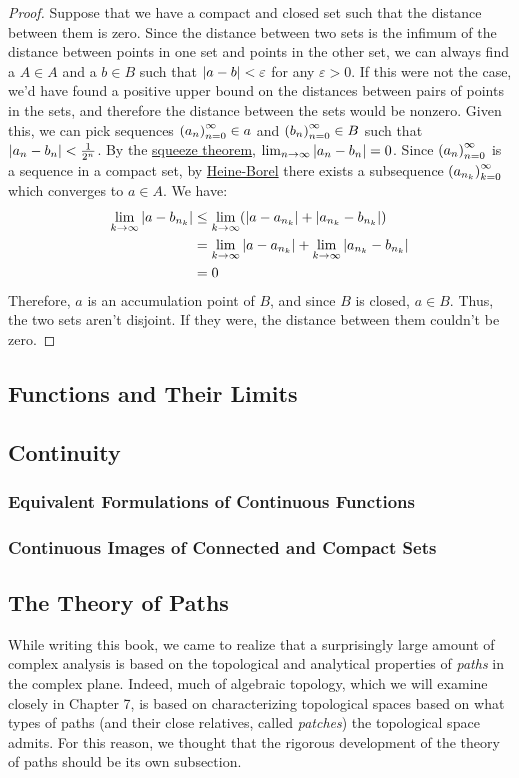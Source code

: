 \begin{proof}
Suppose that we have a compact and closed set such that the distance between them is zero. Since the distance between two sets is the infimum of the distance between points in one set and points in the other set, we can always find a $A \in A$ and a $b \in B$ such that $\left\lvert a-b \right\rvert < \varepsilon$ for any $\varepsilon > 0$. If this were not the case, we'd have found a positive upper bound on the distances between pairs of points in the sets, and therefore the distance between the sets would be nonzero. Given this, we can pick sequences $\seq{a} \in a$ and $\seq{b} \in B$ such that $\left\lvert a_n - b_n \right\rvert < \frac{1}{2^n}$. By the \hyperlink{Squeeze Theorem}{squeeze theorem}, $\lim_{n\to\infty}\left\lvert a_n -b_n \right\rvert = 0$. Since $\seq{a}$ is a sequence in a compact set, by \hyperlink{Heine-Borel Theorem}{Heine-Borel} there exists a subsequence $\seq{a}[n_k][k]$ which converges to $a \in A$. We have:
\begin{align*}
\lim_{k\to\infty}\left\lvert a-b_{n_k} \right\rvert &\leq \lim_{k\to\infty}(\left\lvert a-a_{n_k} \right\rvert + \left\lvert a_{n_k} - b_{n_k} \right\rvert)\\
&= \lim_{k\to\infty}\left\lvert a-a_{n_k} \right\rvert + \lim_{k\to\infty}\left\lvert a_{n_k}-b_{n_k} \right\rvert\\
&= 0
\end{align*}
Therefore, $a$ is an accumulation point of $B$, and since $B$ is closed, $a\in B$. Thus, the two sets aren't disjoint. If they were, the distance between them couldn't be zero.
\end{proof}
\subsection{Functions and Their Limits}
\subsection{Continuity}
\subsubsection{Equivalent Formulations of Continuous Functions}
\subsubsection{Continuous Images of Connected and Compact Sets}
\subsection{The Theory of Paths}
While writing this book, we came to realize that a surprisingly large amount of complex analysis is based on the topological and analytical properties of \emph{paths} in the complex plane. Indeed, much of algebraic topology, which we will examine closely in Chapter 7, is based on characterizing topological spaces based on what types of paths (and their close relatives, called \emph{patches}) the topological space admits. For this reason, we thought that the rigorous development of the theory of paths should be its own subsection.

